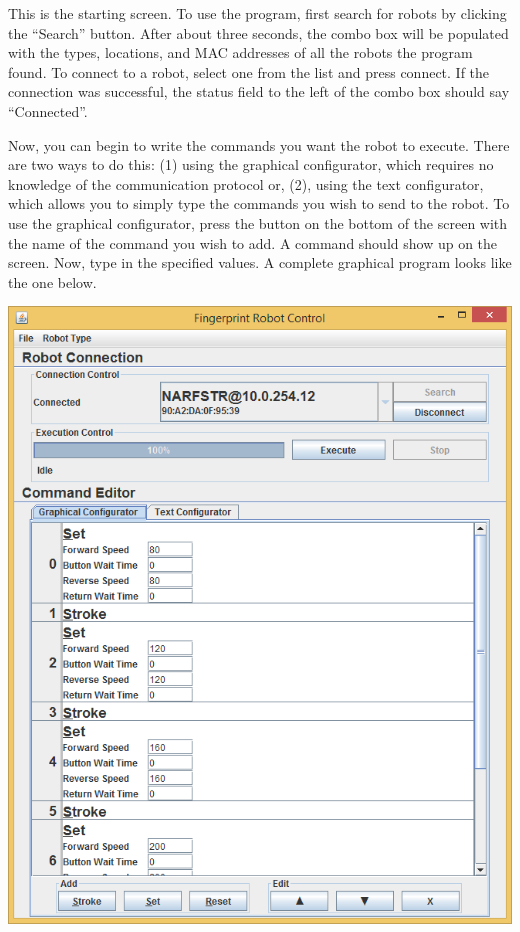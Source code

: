 \documentclass[letterpaper,10pt,english]{sphinxmanual}
\begin{document}
This is the starting screen. To use the program, first search for robots by clicking the ``Search'' button. After about three seconds, the combo box will be populated with the types, locations, and MAC addresses of all the robots the program found. To connect to a robot, select one from the list and press connect. If the connection was successful, the status field to the left of the combo box should say ``Connected''.

Now, you can begin to write the commands you want the robot to execute. There are two ways to do this: (1) using the graphical configurator, which requires no knowledge of the communication protocol or, (2), using the text configurator, which allows you to simply type the commands you wish to send to the robot. To use the graphical configurator, press the button on the bottom of the screen with the name of the command you wish to add. A command should show up on the screen. Now, type in the specified values. A complete graphical program looks like the one below.

\includegraphics{JavaProgramGraphicalConfigurator.PNG}
\end{document}
